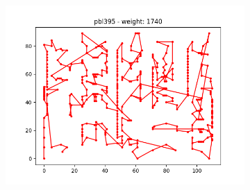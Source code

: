 \documentclass{article}
\def\v{0.4}
\begin{document}
\begin{figure}[h!]
\begin{subfigure}[b]{\v\linewidth}
	\end{subfigure}
	\begin{subfigure}[b]{\v\linewidth}
		\includegraphics[width=\linewidth]{graphs/TSP_pbl395.png}
	\end{subfigure}
\end{figure}
\end{document}
